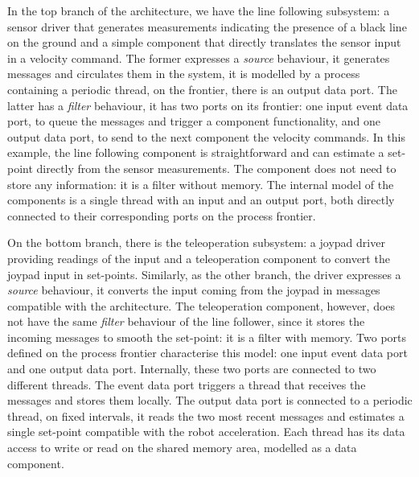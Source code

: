 In the top branch of the architecture, we have the line following subsystem: a sensor driver that generates measurements indicating the presence of a black line on the ground and a simple component that directly translates the sensor input in a velocity command. The former expresses a \textit{source} behaviour, it generates messages and circulates them in the system, it is modelled by a process containing a periodic thread, on the frontier, there is an output data port. The latter has a \textit{filter} behaviour, it has two ports on its frontier: one input event data port, to queue the messages and trigger a component functionality, and one output data port, to send to the next component the velocity commands. In this example, the line following component is straightforward and can estimate a set-point directly from the sensor measurements. The component does not need to store any information: it is a filter without memory. The internal model of the components is a single thread with an input and an output port, both directly connected to their corresponding ports on the process frontier.

On the bottom branch, there is the teleoperation subsystem: a joypad driver providing readings of the input and a teleoperation component to convert the joypad input in set-points. Similarly, as the other branch, the driver expresses a \textit{source} behaviour, it converts the input coming from the joypad in messages compatible with the architecture. The teleoperation component, however, does not have the same \textit{filter} behaviour of the line follower, since it stores the incoming messages to smooth the set-point: it is a filter with memory. Two ports defined on the process frontier characterise this model: one input event data port and one output data port. Internally, these two ports are connected to two different threads. The event data port triggers a thread that receives the messages and stores them locally. The output data port is connected to a periodic thread, on fixed intervals, it reads the two most recent messages and estimates a single set-point compatible with the robot acceleration. Each thread has its data access to write or read on the shared memory area, modelled as a data component.

